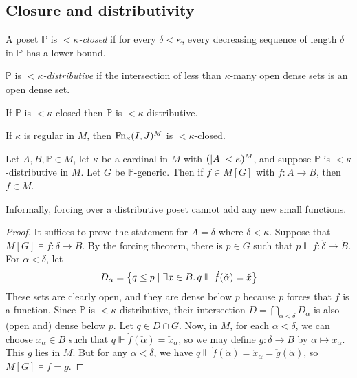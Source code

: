 \subsection{Closure and distributivity}
\begin{definition}
    A poset \( \mathbb P \) is \emph{\( <\kappa \)-closed} if for every \( \delta < \kappa \), every decreasing sequence of length \( \delta \) in \( \mathbb P \) has a lower bound.
\end{definition}
\begin{definition}
    \( \mathbb P \) is \emph{\( <\kappa \)-distributive} if the intersection of less than \( \kappa \)-many open dense sets is an open dense set.
\end{definition}
\begin{lemma}
    If \( \mathbb P \) is \( <\kappa \)-closed then \( \mathbb P \) is \( <\kappa \)-distributive.
\end{lemma}
\begin{lemma}
    If \( \kappa \) is regular in \( M \), then \( \operatorname{Fn}_\kappa(I, J)^M \) is \( <\kappa \)-closed.
\end{lemma}
\begin{theorem}
    Let \( A, B, \mathbb P \in M \), let \( \kappa \) be a cardinal in \( M \) with \( (\abs{A} < \kappa)^M \), and suppose \( \mathbb P \) is \( <\kappa \)-distributive in \( M \).
    Let \( G \) be \( \mathbb P \)-generic.
    Then if \( f \in M[G] \) with \( f : A \to B \), then \( f \in M \).
\end{theorem}
Informally, forcing over a distributive poset cannot add any new small functions.
\begin{proof}
    It suffices to prove the statement for \( A = \delta \) where \( \delta < \kappa \).
    Suppose that \( M[G] \vDash f : \delta \to B \).
    By the forcing theorem, there is \( p \in G \) such that \( p \Vdash \dot f : \check \delta \to \check B \).
    For \( \alpha < \delta \), let
    \[ D_\alpha = \qty{q \leq p \mid \exists x \in B .\, q \Vdash \dot f(\check \alpha) = \check x} \]
    These sets are clearly open, and they are dense below \( p \) because \( p \) forces that \( \dot f \) is a function.
    Since \( \mathbb P \) is \( <\kappa \)-distributive, their intersection \( D = \bigcap_{\alpha < \delta} D_\alpha \) is also (open and) dense below \( p \).
    Let \( q \in D \cap G \).
    Now, in \( M \), for each \( \alpha < \delta \), we can choose \( x_\alpha \in B \) such that \( q \Vdash \dot f(\check \alpha) = \check x_\alpha \), so we may define \( g : \delta \to B \) by \( \alpha \mapsto x_\alpha \).
    This \( g \) lies in \( M \).
    But for any \( \alpha < \delta \), we have \( q \Vdash \dot f(\check \alpha) = \check x_\alpha = \check g(\check \alpha) \), so \( M[G] \vDash f = g \).
\end{proof}

